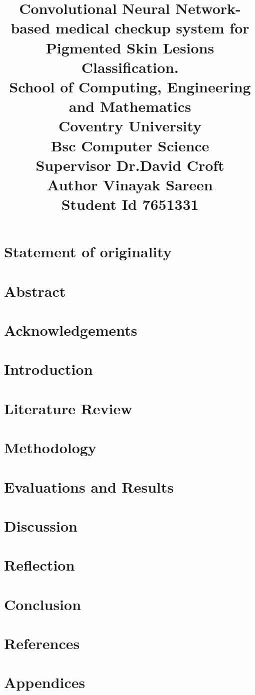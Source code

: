\documentclass[13pt]{report}
\title{
	{Convolutional Neural Network-based medical checkup system for Pigmented Skin Lesions Classification.} \\
	\vspace{5mm} %
	{\large School of Computing, Engineering and Mathematics} \\
	{\large Coventry University} \\
	\vspace{3mm} %
	{\large Bsc Computer Science}\\
	{\large Supervisor Dr.David Croft}\\
	{\large Author Vinayak Sareen}\\
	{\large Student Id 7651331}
}
\date{}
\begin{document}
\maketitle

\chapter*{Statement of originality}

\tableofcontents

\chapter*{Abstract}


\chapter*{Acknowledgements}


\chapter{Introduction}



\chapter{Literature Review}


\chapter{Methodology}


\chapter{Evaluations and Results}


\chapter{Discussion}


\chapter{Reflection}


\chapter{Conclusion}


\chapter*{References}


\chapter*{Appendices}

\end{document}
